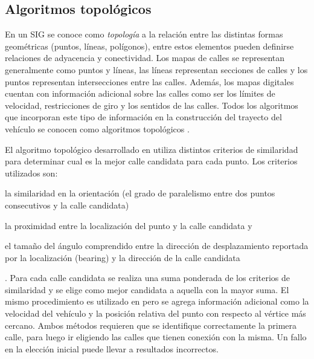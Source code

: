 \subsection{Algoritmos topológicos}

En un SIG se conoce como \emph{topología} a la relación entre las distintas formas geométricas (puntos, líneas, polígonos), entre estos elementos pueden definirse relaciones de adyacencia y conectividad. Los mapas de calles se representan generalmente como puntos y líneas, las líneas representan secciones de calles y los puntos representan intersecciones entre las calles. Además, los mapas digitales cuentan con información adicional sobre las calles como ser los límites de velocidad, restricciones de giro y los sentidos de las calles. Todos los algoritmos que incorporan este tipo de información en la construcción del trayecto del vehículo se conocen como algoritmos topológicos \cite{quddus2007current}.

El algoritmo topológico desarrollado en \cite{greenfeld2002matching} utiliza distintos criterios de similaridad para determinar cual es la mejor calle candidata para cada punto. Los criterios utilizados son: \begin{enumerate*}[a)] \item la similaridad en la orientación (el grado de paralelismo entre dos puntos consecutivos y la calle candidata) \item la proximidad entre la localización del punto y la calle candidata y \item el tamaño del ángulo comprendido entre la dirección de desplazamiento reportada por la localización (bearing) y la dirección de la calle candidata \end{enumerate*}. Para cada calle candidata se realiza una suma ponderada de los criterios de similaridad y se elige como mejor candidata a aquella con la mayor suma. El mismo procedimiento es utilizado en \cite{quddus2003general} pero se agrega información adicional como la velocidad del vehículo y la posición relativa del punto con respecto al vértice más cercano. Ambos métodos requieren que se identifique correctamente la primera calle, para luego ir eligiendo las calles que tienen conexión con la misma. Un fallo en la elección inicial puede llevar a resultados incorrectos.


